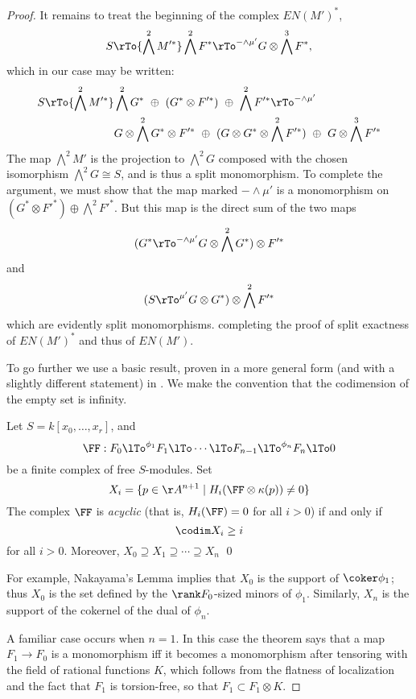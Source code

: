 \begin{proof}
It remains to treat the beginning of the complex $EN(M')^*$,
$$
S \rTo{\bigwedge^2 M'^*} 
 \bigwedge^2 F^*
 \rTo^{-\wedge \mu'}
G\otimes \bigwedge^3 F^*,
$$
which in our case may be written:
\begin{align*}
S \rTo{\bigwedge^2 M'^*} 
 &\bigwedge^2 G^* \ \oplus\ (G^*\otimes F'^*)\ \oplus\ \bigwedge^2 F'^*
 \rTo^{-\wedge \mu'} \\
 &G\otimes \bigwedge^2 G^*\otimes F'^*\ \oplus\ (G\otimes G^*\otimes \bigwedge^2 F'^*)\ \oplus\ G\otimes \bigwedge^3 F'^*
\end{align*}
The map $\bigwedge^2 M'$ is the projection to $\bigwedge^2 G$ composed with the chosen isomorphism
$\bigwedge^2 G \cong S$, and is thus a split monomorphism. To complete the argument, we must show that
 the map marked $-\wedge \mu'$ is a monomorphism on $(G^*\otimes F'^*) \oplus \bigwedge^2 F'^*$.
 But this map is the direct sum of the two maps
  $$
 (G^* \rTo^{-\wedge \mu'} G\otimes \bigwedge^2 G^*)  \otimes F'^*
 $$
 and
 $$
(S  \rTo^{\mu'} G\otimes G^*) \otimes \bigwedge^2 F'^*
 $$
 which are evidently split monomorphisms. 
completing the proof of split exactness of $EN(M')^*$ and thus of $EN(M')$.


To go further we use a basic result, proven in a more general form (and with a slightly different statement) in \cite[Theorem 20.9]{Eisenbud1995}. We make the convention
that the codimension of the empty set is infinity.

\begin{theorem}\label{WMACE}
 Let $S = k[x_0,\dots, x_r]$, and
 $$ 
\FF:  F_0\lTo^{\phi_1}F_1 \lTo \cdots \lTo F_{n-1}\lTo^{\phi_n} F_n\lTo 0
 $$
be a finite complex of free $S$-modules. Set
$$
X_i = \{p\in \AA^{n+1} \mid  H_i(\FF \otimes \kappa(p)) \neq 0\}
$$
The complex $\FF$ is \emph{acyclic} (that is, $H_i(\FF) = 0$ for all $i>0$) if and only if
$$
\codim X_i \geq i
$$
for all $i>0$. Moreover, $X_{0}\supseteq X_{1}\supseteq \cdots \supseteq X_{n}$
\qed
\end{theorem}

For example, Nakayama's Lemma implies that $X_{0}$ is the support of $\coker \phi_{1}$; thus $X_{0}$ is the set defined by the $\rank F_{0}$-sized minors of $\phi_{1}$. Similarly, 
$X_{n}$ is the support of the cokernel of the dual of $\phi_{n}$. 

A familiar case occurs when  $n=1$. In this case the theorem says that a map $F_1\to F_0$ is a monomorphism iff it becomes a monomorphism after tensoring with the field of rational functions $K$, which follows from the flatness of
localization and the fact that $F_1$ is torsion-free, so that
$F_1 \subset F_1 \otimes K$. 


\end{proof}
